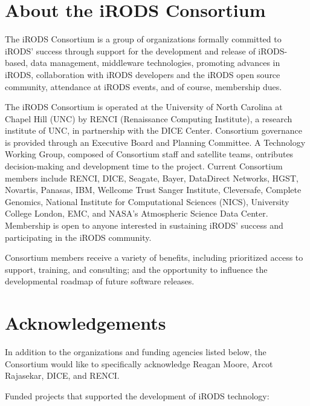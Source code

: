 \documentclass[10pt,oneside]{memoir}
\begin{document}
\section{About the iRODS Consortium}

The iRODS Consortium is a group of organizations formally committed to iRODS' success through support for the development and release of iRODS-based, data management, middleware technologies, promoting advances in iRODS, collaboration with iRODS developers and the iRODS open source community, attendance at iRODS events, and of course, membership dues.

The iRODS Consortium is operated at the University of North Carolina at Chapel Hill (UNC) by RENCI (Renaissance Computing Institute), a research institute of UNC, in partnership with the DICE Center. Consortium governance is provided through an Executive Board and Planning Committee. A Technology Working Group, composed of Consortium staff and satellite teams, ontributes decision-making and development time to the project. Current Consortium members include RENCI, DICE, Seagate, Bayer, DataDirect Networks, HGST, Novartis, Panasas, IBM, Wellcome Trust Sanger Institute, Cleversafe, Complete Genomics, National Institute for Computational Sciences (NICS), University College London, EMC, and NASA's Atmospheric Science Data Center. Membership is open to anyone interested in sustaining iRODS' success and participating in the iRODS community.

Consortium members receive a variety of benefits, including prioritized access to support, training, and consulting; and the opportunity to influence the developmental roadmap of future software releases.


\newpage
\section{Acknowledgements}

In addition to the organizations and funding agencies listed below, the Consortium would like to specifically acknowledge Reagan Moore, Arcot Rajasekar, DICE, and RENCI.

Funded projects that supported the development of iRODS technology:
\end{document}

